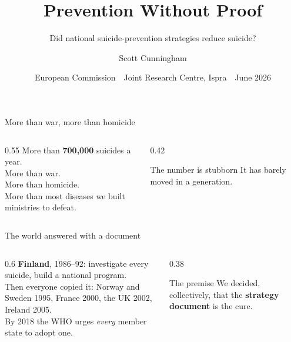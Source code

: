 \documentclass[aspectratio=169,11pt]{beamer}
\title{Prevention Without Proof}
\subtitle{Did national suicide-prevention strategies reduce suicide?}
\author{Scott Cunningham}
\institute{Baylor University}
\date{European Commission \,\textperiodcentered\, Joint Research Centre, Ispra \,\textperiodcentered\, June 2026}
\begin{document}
\begin{frame}[plain]\titlepage\end{frame}


\begin{frame}{More than war, more than homicide}
\begin{columns}[T]
\begin{column}{0.55\textwidth}
\vspace{1.2em}
{\Large More than \textbf{700{,}000} suicides a year.}\\[1.2em]
{\large More than war.}\\[0.4em]
{\large More than homicide.}\\[0.4em]
{\large More than most diseases we built ministries to defeat.}
\end{column}
\begin{column}{0.42\textwidth}
\vspace{0.6em}
\begin{block}{The number is stubborn}
It has barely moved in a generation.
\end{block}
\end{column}
\end{columns}
\end{frame}

\begin{frame}{The world answered with a document}
\begin{columns}[T]
\begin{column}{0.6\textwidth}
\vspace{0.8em}
\textbf{Finland}, 1986--92: investigate every suicide, build a national program.\\[0.8em]
Then everyone copied it: Norway and Sweden 1995, France 2000, the UK 2002, Ireland 2005.\\[0.8em]
By 2018 the WHO urges \emph{every} member state to adopt one.
\end{column}
\begin{column}{0.38\textwidth}
\vspace{1.4em}
\begin{alertblock}{The premise}
We decided, collectively, that the \textbf{strategy document} is the cure.
\end{alertblock}
\end{column}
\end{columns}
\end{frame}
\end{document}
